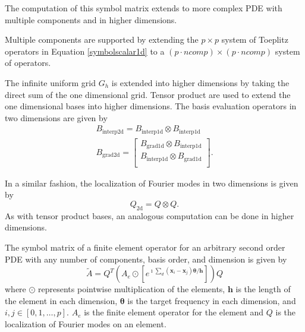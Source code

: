 \documentclass[review]{siamart190516}
\begin{document}
The computation of this symbol matrix extends to more complex PDE with multiple components and in higher dimensions.

Multiple components are supported by extending the $p \times p$ system of Toeplitz operators in Equation \ref{symbolscalar1d} to a $\left( p \cdot ncomp \right) \times \left( p \cdot ncomp \right)$ system of operators.

The infinite uniform grid $G_h$ is extended into higher dimensions by taking the direct sum of the one dimensional grid.
Tensor product are used to extend the one dimensional bases into higher dimensions.
The basis evaluation operators in two dimensions are given by
\begin{equation}
\begin{split}
B_{\text{interp2d}} = B_{\text{interp1d}} \otimes B_{\text{interp1d}} \\
B_{\text{grad2d}} =
\begin{bmatrix}
    B_{\text{grad1d}} \otimes B_{\text{interp1d}} \\
    B_{\text{interp1d}} \otimes B_{\text{grad1d}} \\
\end{bmatrix}.
\end{split}
\end{equation}

In a similar fashion, the localization of Fourier modes in two dimensions is given by
\begin{equation}
Q_{\text{2d}} = Q \otimes Q.
\end{equation}
As with tensor product bases, an analogous computation can be done in higher dimensions.

\begin{definition}
The symbol matrix of a finite element operator for an arbitrary second order PDE with any number of components, basis order, and dimension is given by
\begin{equation}\label{symbolhighorder}
\tilde{A} = Q^T \left( A_e \odot \left[ e^{\imath \sum_d \left( \mathbf{x}_i - \mathbf{x}_j \right) \mathbf{\theta} / \mathbf{h}} \right] \right) Q
\end{equation}
where $\odot$ represents pointwise multiplication of the elements, $\mathbf{h}$ is the length of the element in each dimension, $\mathbf{\theta}$ is the target frequency in each dimension, and $i, j \in \left[ 0, 1, \dots, p\right]$.
$A_e$ is the finite element operator for the element and $Q$ is the localization of Fourier modes on an element.
\end{definition}\label{def:high_order_symbol}
\end{document}
